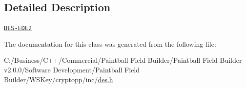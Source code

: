 \subsection{Detailed Description}
\href{http://www.weidai.com/scan-mirror/cs.html#DESede}{\tt DES-\/EDE2} 

The documentation for this class was generated from the following file:\begin{DoxyCompactItemize}
\item 
C:/Business/C++/Commercial/Paintball Field Builder/Paintball Field Builder v2.0.0/Software Development/Paintball Field Builder/WSKey/cryptopp/inc/\hyperlink{des_8h}{des.h}\end{DoxyCompactItemize}
